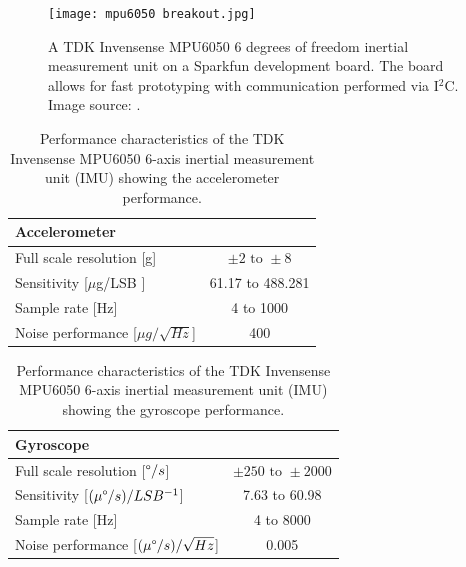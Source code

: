\begin{figure}[H]
	\centering
	\texttt{[image: mpu6050 breakout.jpg]}
	\caption{A TDK Invensense MPU6050 6 degrees of freedom inertial measurement unit on a Sparkfun development board. The board allows for fast prototyping with communication performed via I$^2$C. Image source: \cite{mpu6050breakout}.}
	\label{fig:mpubreakout}
\end{figure}

\begin{table}[H]
	\centering
	\caption{Performance characteristics of the TDK Invensense MPU6050 6-axis inertial measurement unit (IMU) showing the accelerometer performance. }
	\setlength{\extrarowheight}{5pt}
	\begin{tabular}{lc}
		\hline
		\multicolumn{2}{l}{\textbf{Accelerometer}}\\
		\hline
		\hline
		Full scale resolution [g] & $ \pm\text{2 to } \pm\text{8}$\\
		\hline
		Sensitivity [$\mu$g/LSB ] &  61.17 to 488.281\\
		\hline
		Sample rate [Hz] & 4 to 1000\\
		\hline
		Noise performance [$\mu g/\sqrt{Hz}$] & 400\\
		\hline
		\hline
	\end{tabular}
	\label{tab:mpu_specscc}
\end{table}

\begin{table}[H]
	\centering
	\caption{Performance characteristics of the TDK Invensense MPU6050 6-axis inertial measurement unit (IMU) showing the gyroscope performance. }
	\setlength{\extrarowheight}{5pt}
	\begin{tabular}{lc}
		\hline
		\multicolumn{2}{l}{\textbf{Gyroscope}}\\
		\hline
		\hline
		Full scale resolution [$\degree/s$]  & $\pm \text{250 to } \pm \text{2000}$ \\
		\hline
		Sensitivity [$(\mu\degree/s)/LSB^{-1}$]&  7.63 to 60.98\\
		\hline
		Sample rate [Hz] & 4 to 8000\\
		\hline
		Noise performance [$(\mu\degree/s)/\sqrt{Hz}$] & 0.005\\
		\hline
		\hline
	\end{tabular}
	\label{tab:mpu_specsgyro}
\end{table}

